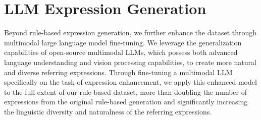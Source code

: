 \section{LLM Expression Generation}

Beyond rule-based expression generation, we further enhance the dataset through multimodal large language model fine-tuning. We leverage the generalization capabilities of open-source multimodal LLMs, which possess both advanced language understanding and vision processing capabilities, to create more natural and diverse referring expressions. Through fine-tuning a multimodal LLM specifically on the task of expression enhancement, we apply this enhanced model to the full extent of our rule-based dataset, more than doubling the number of expressions from the original rule-based generation and significantly increasing the linguistic diversity and naturalness of the referring expressions.

